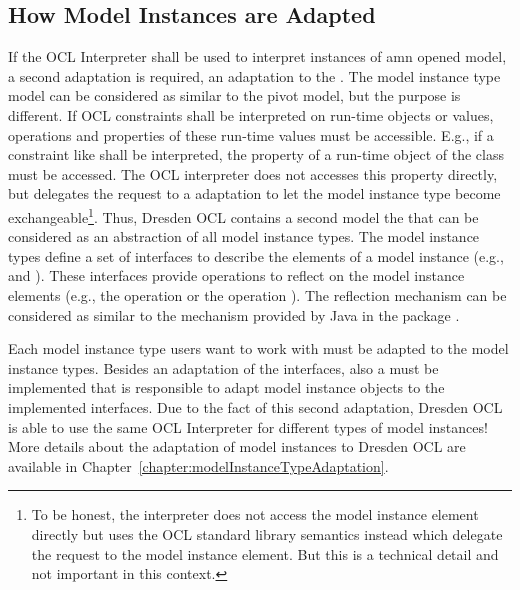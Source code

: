 \subsection{How Model Instances are Adapted}
\label{architecture:modelInstanceAdaptation}

If the \acs{OCL} Interpreter shall be used to interpret instances of amn opened 
model, a second adaptation is required, an adaptation to the . The model instance type model can be considered as similar
to the pivot model, but the purpose is different. If \acs{OCL} constraints shall
be interpreted on run-time objects or values, operations and properties of these
run-time values must be accessible. E.g., if a constraint like  shall be interpreted, the property  of a
run-time object of the class  must be accessed. The \acs{OCL} 
interpreter does not accesses this property directly, but delegates the request 
to a  adaptation to let the model instance type
become exchangeable\footnote{To be honest, the interpreter does not access the
model instance element directly but uses the \acs{OCL} standard library
semantics instead which delegate the request to the model instance element. But
this is a technical detail and not important in this context.}. Thus,
Dresden OCL contains a second model the 
that can be considered as an abstraction of all model instance types. The model 
instance types define a set of interfaces to describe the elements of a model 
instance (e.g.,  and 
). These interfaces provide operations to reflect on 
the model instance elements (e.g., the operation
 or the operation 
). The reflection mechanism can be 
considered as similar to the mechanism provided by Java in the package 
.

Each model instance type users want to work with must be adapted to the model 
instance types. Besides an adaptation of the interfaces, also a 
 must be implemented that is responsible to adapt 
model instance objects to the implemented interfaces. Due to the fact of this 
second adaptation, Dresden OCL is able to use the same \acs{OCL} Interpreter for
different types of model instances! More details about the adaptation of model 
instances to Dresden OCL are available in 
Chapter~\ref{chapter:modelInstanceTypeAdaptation}.


